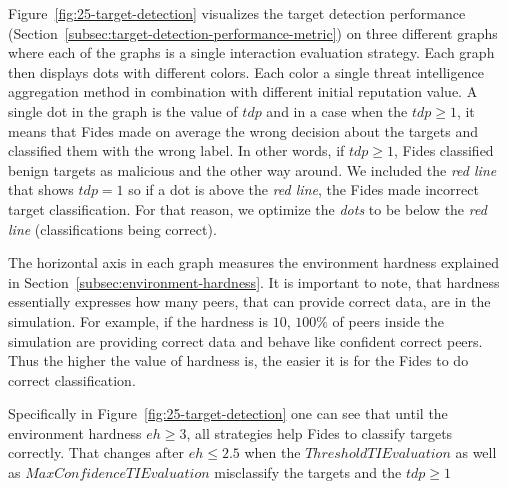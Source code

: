 Figure~\ref{fig:25-target-detection} visualizes the target detection performance (Section~\ref{subsec:target-detection-performance-metric}) on three different graphs where each of the graphs is a single interaction evaluation strategy.
Each graph then displays dots with different colors. Each color a single threat intelligence aggregation method in combination with different initial reputation value.
A single dot in the graph is the value of $tdp$ and in a case when the $tdp \geq 1$, it means that Fides made on average the wrong decision about the targets and classified them with the wrong label.
In other words, if $tdp \geq 1$, Fides classified benign targets as malicious and the other way around.
We included the \textit{red line} that shows $tdp = 1$ so if a dot is above the \textit{red line}, the Fides made incorrect target classification.
For that reason, we optimize the \textit{dots} to be below the \textit{red line} (classifications being correct).

The horizontal axis in each graph measures the environment hardness explained in Section~\ref{subsec:environment-hardness}. It is important to note, that hardness essentially expresses how many peers, that can provide correct data, are in the simulation. For example, if the hardness is $10$, $100\%$ of peers inside the simulation are providing correct data and behave like confident correct peers.
Thus the higher the value of hardness is, the easier it is for the Fides to do correct classification.

Specifically in Figure~\ref{fig:25-target-detection} one can see that until the environment hardness $eh \geq 3$, all strategies help Fides to classify targets correctly.
That changes after $eh \leq 2.5$ when the $ThresholdTIEvaluation$ as well as $MaxConfidenceTIEvaluation$ misclassify the targets and the $tdp \geq 1$ 


